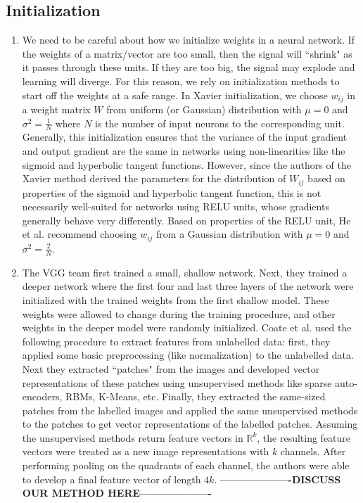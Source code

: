 \documentclass[a4paper]{article}
\begin{document}
\subsection{Initialization}
\begin{enumerate}
\item{ We need to be careful about how we initialize weights in a neural network. If the weights of a matrix/vector are too small, then the signal will ``shrink" as it passes through these units. If they are too big, the signal may explode and learning will diverge. For this reason, we rely on initialization methods to start off the weights at a safe range. 
\newline
\newline
In Xavier initialization, we choose $w_{ij}$ in a weight matrix $W$ from uniform (or Gaussian) distribution with $\mu=0$ and $\sigma^2 = \frac{1}{N}$ where $N$ is the number of input neurons to the corresponding unit. Generally, this initialization ensures that the variance of the input gradient and output gradient are the same in networks using non-linearities like the sigmoid and hyperbolic tangent functions.
\newline
\newline
However, since the authors of the Xavier method derived the parameters for the distribution of $W_{ij}$ based on properties of the sigmoid and hyperbolic tangent function, this is not necessarily well-suited for networks using RELU units, whose gradients generally behave very differently. Based on properties of the RELU unit, He et al. recommend choosing $w_{ij}$ from a Gaussian distribution with $\mu=0$ and $\sigma^2=\frac{2}{N}$. 

}
\item{ The VGG team first trained a small, shallow network. Next, they trained a deeper network where the first four and last three layers of the network were initialized with the trained weights from the first shallow model. These weights were allowed to change during the training procedure, and other weights in the deeper model were randomly initialized. 
\newline
\newline 
Coate et al. used the following procedure to extract features from unlabelled data: first, they applied some basic preprocessing (like normalization) to the unlabelled data. Next they extracted ``patches" from the images and developed vector representations of these patches using unsupervised methods like sparse auto-encoders, RBMs, K-Means, etc. Finally, they extracted the same-sized patches from the labelled images and applied the same unsupervised methods to the patches to get vector representations of the labelled patches. Assuming the unsupervised methods return feature vectors in $\mathbb{R}^k$, the resulting feature vectors were treated as a new image representations with $k$ channels. After performing pooling on the quadrants of each channel, the authors were able to develop a final feature vector of length $4k$. 
\newline
\newline
\textbf{-------------------DISCUSS OUR METHOD HERE-------------------}

}
\end{enumerate}
\end{document}
